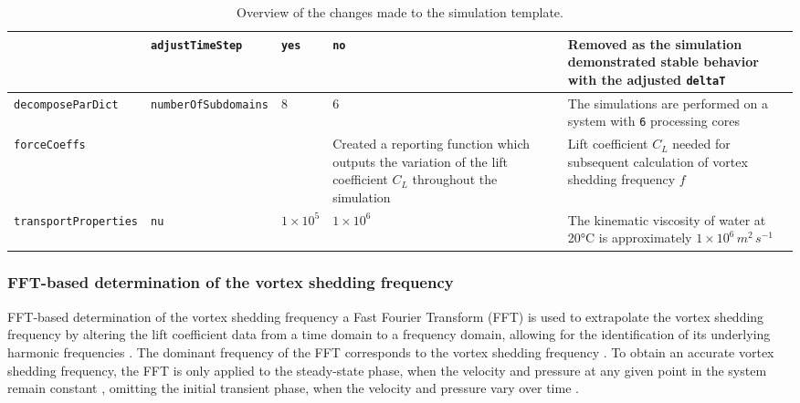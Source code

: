 \begin{table}[H]
{\begin{tabularx}{1.2\textwidth}{|p{3cm}|p{3.3cm}|p{2.8cm}|p{3cm}|X|}
			& {\small\verb*|adjustTimeStep|} & \verb*|yes| & \verb*|no| &
			 Removed as the simulation demonstrated stable behavior with the adjusted \verb*|deltaT| \parencite{jayaraj2024openfoam}
			 \\ 
			
			\hline
			
			{\footnotesize\verb*|decomposeParDict|} & {\footnotesize\verb*|numberOfSubdomains|} & 8 & 6 & The simulations are performed on a system with \verb*|6| processing cores \parencite{jayaraj2024openfoam} \\
			\hline
			
			\verb*|forceCoeffs| & \textemdash & \textemdash & Created a reporting function which outputs the variation of the lift coefficient $C_L$ throughout the simulation & Lift coefficient $C_L$ needed for subsequent calculation of vortex shedding frequency $f$\\
			\hline
			
			{\scriptsize\verb*|transportProperties|} & \verb*|nu| & $1\times 10^{5}$ & $1\times 10^{6}$ & The kinematic viscosity of water at 20°C is approximately $1\times 10^{6} \, m^2\,s^{-1}$ \parencite{noauthor_water_nodate}\\
			\hline
		\end{tabularx}
	}
	\caption{Overview of the changes made to the simulation template.}
	\label{tab:simulation_changes}
\end{table}


\subsubsection{FFT-based determination of the vortex shedding frequency}
FFT-based determination of the vortex shedding frequency a Fast Fourier Transform (FFT) is used to extrapolate the vortex shedding frequency by altering the lift coefficient data from a time domain to a frequency domain, allowing for the identification of its underlying harmonic frequencies \parencite[10--11]{shi2025vortex}. The dominant frequency of the FFT corresponds to the vortex shedding frequency \parencite[12]{xu_experimental_2025}. To obtain an accurate vortex shedding frequency, the FFT is only applied to the steady-state phase, when the velocity and pressure at any given point in the system remain constant \parencite{noauthor_steady_nodate}, omitting the initial transient phase, when the velocity and pressure vary over time \parencite{noauthor_transient_nodate}. 


